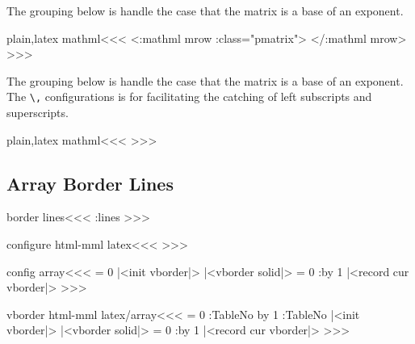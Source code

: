 {{{{{{The grouping below is handle the case that the matrix is a base of an exponent.


\<plain,latex mathml\><<<
  {\bgroup\Tg<\a:mathml mrow\Hnewline
   \mml:class="pmatrix">}  {\Tg</\a:mathml mrow>\egroup}
>>>



The grouping below is handle the case that the matrix is a base of an
exponent. The \verb|\,| configurations is for facilitating the
catching of  left subscripts and superscripts.


\<plain,latex mathml\><<<
\Configure{,}
   {{}}
\Configure{:}
   {{}}
\Configure{;}
   {{}}
\Configure{>}
   {{}}
\Configure{!}
   {{}}
>>>


\subsection{Array Border Lines}


\<border lines\><<<
\border:lines
>>>

\<configure html-mml latex\><<<
\def\border:lines{%
  \ifnum \borderlines>0 
     \ifnum \borderlines>1 border-right:solid 1px black;\fi
     \ifodd \borderlines border-left:solid 1px black;\fi
  \fi
}
>>>




\<config array\><<<
   {\HAssign\NewGroup = 0 
    |<init vborder|>}
   {|<vborder solid|>%
    \HAssign\NewGroup = 0}
   {\Advance:\NewGroup by 1 
    |<record cur vborder|>}
   {}
>>>



\<vborder html-mml latex/array\><<<
   {\let\VBorder=\empty \let\AllColMargins=\empty
    \global\let\GROUPS=\empty \HAssign\NewGroup = 0 
    \gHAdvance\Next:TableNo by 1 \global\let\TableNo=\Next:TableNo
    |<init vborder|>%
   }
   {|<vborder solid|>%
    \xdef\VBorder{\VBorder\ifnum \NewGroup> 0 </colgroup>\fi}
    \HAssign\NewGroup = 0  \gdef\GROUPS{rules="groups"}}
   {\Advance:\NewGroup by 1
    |<record cur vborder|>%
    \ifnum {} \xdef\VBorder{\VBorder<colgroup 
        id="TBL-\TableNo-\ar:cnt g">}\fi      
    \xdef\VBorder{\VBorder<col\Hnewline id="TBL-\TableNo
       -\ar:cnt"\xml:empty>}\xdef\AllColMargins{\AllColMargins1}}
   {\xdef\AllColMargins{\AllColMargins 0}}
>>>



}}}}}}
